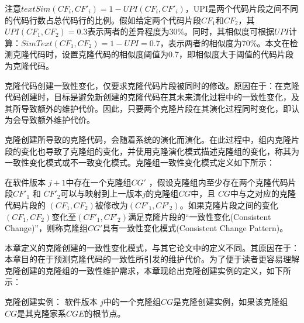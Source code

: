 注意$\mathit {textSim}(CF_i, CF'_i)= 1 - UPI(CF_i, CF'_i)$，UPI是两个代码片段之间不同的代码行数占总代码行的比例。假如给定两个代码片段$CF_1$和$CF_2$，其$UPI(CF_1,CF_2)=0.3$表示两者的差异程度为30\%。同时，其相似度可根据$UPI$计算：$SimText (CF_1,CF_2)=1-UPI=0.7$，表示两者的相似度为70\%。本文在检测克隆代码时，设置克隆代码的相似度阈值为0.7，即相似度大于阈值的代码片段为克隆代码。%


克隆代码创建一致性变化，仅要求克隆代码片段被同时的修改。原因在于：在克隆代码创建时，目标是避免新创建的克隆代码在其未来演化过程中的一致性变化，及其所导致额外的维护代价。因此，只要两个克隆片段在其演化过程同时变化，即认为会导致额外维护代价。

克隆创建所导致的克隆代码，会随着系统的演化而演化。在此过程中，组内克隆片段的变化也导致了克隆组的变化，并使用克隆演化模式描述克隆组的变化，称其为一致性变化模式或不一致变化模式。克隆组一致性变化模式定义如下所示：

\begin{definition}[创建一致性变化模式] 
\label{def-creatingpattern}
在软件版本 $j+1$中存在一个克隆组$CG'$ ，假设克隆组内至少存在两个克隆代码片段$CF'_1$ 和 $CF'_2$可以与映射到上一版本$j$的克隆组$CG$中，且 $CG$中与之对应的克隆代码片段的 $(CF_1,CF_2)$被修改为$(CF'_1,CF'_2)$。如果克隆片段之间的变化$(CF_1,CF_2)$变化至$(CF'_1,CF'_2)$满足克隆片段的“一致性变化(Consistent Change)”，则称克隆组$CG'$具有一致性变化模式(Consistent Change Pattern)。
\end{definition}

本章定义的克隆创建的一致性变化模式，与其它论文中的定义不同。其原因在于：本章目的在于预测克隆代码的一致性所引发的维护代价。为了便于读者更容易理解克隆创建的克隆组的一致性维护需求，本章现给出克隆创建实例的定义，如下所示：

\begin{definition}[克隆创建实例] 
\label{def-creatinginstance}
克隆创建实例：
软件版本 $j$中的一个克隆组$CG$是克隆创建实例，如果该克隆组$CG$是其克隆家系$CGE$的根节点。
\end{definition}


